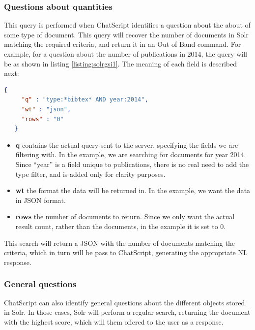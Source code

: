 \subsubsection{Questions about quantities}

This query is performed when ChatScript identifies a question about the about of some type of document. This query will recover the number of documents in Solr matching the required criteria, and return it in an Out of Band command. For example, for a question about the number of publications in 2014, the query will be as shown in listing \ref{listing:solrgsi1}. The meaning of each field is described next:

\begin{center} 
  \begin{lstlisting}[language=json, caption=Example JSON query for Solr, label=listing:solrgsi1]
   {
     "q" : "type:*bibtex* AND year:2014",
     "wt" : "json",
     "rows" : "0"
   }  
  \end{lstlisting}
\end{center}

\begin{itemize}
  \item \textbf{q} contains the actual query sent to the server, specifying the fields we are filtering with. In the example, we are searching for documents for year 2014. Since ``year'' is a field unique to publications, there is no real need to add the type filter, and is added only for clarity purposes.
  \item \textbf{wt} the format the data will be returned in. In the example, we want the data in JSON format.
  \item \textbf{rows} the number of documents to return. Since we only want the actual result count, rather than the documents, in the example it is set to 0.
\end{itemize}

This search will return a JSON with the number of documents matching the criteria, which in turn will be pass to ChatScript, generating the appropriate \ac{NL} response.

\subsubsection{General questions}

ChatScript can also identify general questions about the different objects stored in Solr. In those cases, Solr will perform a regular search, returning the document with the highest score, which will them offered to the user as a response.

